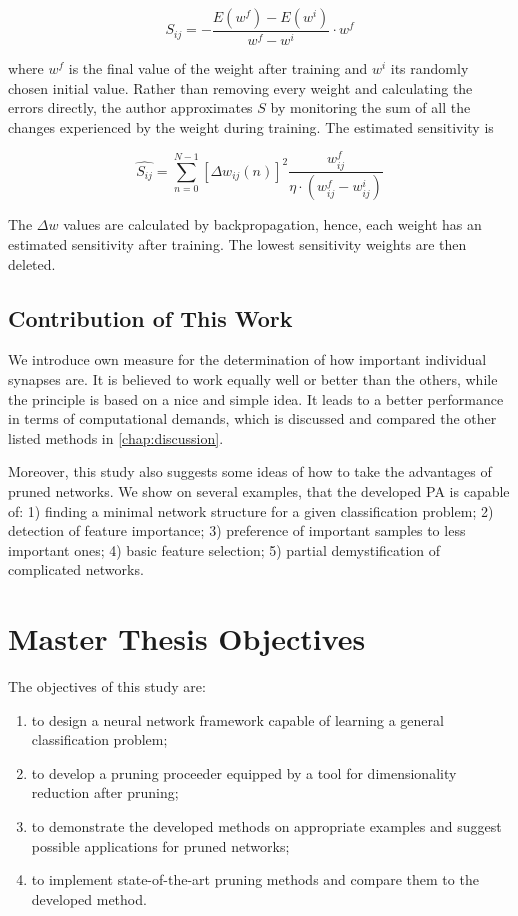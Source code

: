 \begin{equation}
S_{ij} = - \frac{E(w^f) - E(w^i)}{w^f - w^i} \cdot w^f
\end{equation}

where $ w^f $ is the final value of the weight after training and $ w^i $ its randomly chosen initial value. Rather than removing every weight and calculating the errors directly, the author approximates $ S $ by monitoring the sum of all the changes experienced by the weight during training. The estimated sensitivity is

\begin{equation}
\hat{S_{ij}} = \displaystyle{\sum_{n=0}^{N-1} \left[\Delta w_{ij} (n)\right]^2 \frac{w_{ij}^f}{\eta \cdot (w_{ij}^f - w_{ij}^i)}}
\end{equation}

The $ \Delta w $ values are calculated by backpropagation, hence, each weight has an estimated sensitivity after training. The lowest sensitivity weights are then deleted.

\subsection*{Contribution of This Work} \label{ssec:contribution_of_this_work}
We introduce own measure for the determination of how important individual synapses are. It is believed to work equally well or better than the others, while the principle is based on a nice and simple idea. It leads to a better performance in terms of computational demands, which is discussed and compared the other listed methods in \cref{chap:discussion}.

Moreover, this study also suggests some ideas of how to take the advantages of pruned networks. We show on several examples, that the developed PA is capable of: 1) finding a minimal network structure for a given classification problem; 2) detection of feature importance; 3) preference of important samples to less important ones; 4) basic feature selection; 5) partial demystification of complicated networks.

\section{Master Thesis Objectives} \label{sec:thesis_objectives}
The objectives of this study are:

\begin{enumerate}
\item to design a neural network framework capable of learning a general classification problem;
\item to develop a pruning proceeder equipped by a tool for dimensionality reduction after pruning;
\item to demonstrate the developed methods on appropriate examples and suggest possible applications for pruned networks;
\item to implement state-of-the-art pruning methods and compare them to the developed method.
\end{enumerate}

